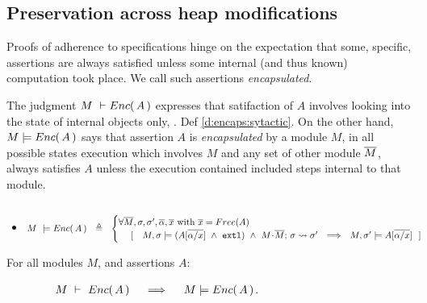 \subsection{Preservation across heap modifications}

 
Proofs of adherence to {\SpecLang specifications  hinge on the expectation that some,  specific, assertions are always satisfied unless some 
} internal (and thus known) computation took place. 
{We call such assertions   \emph{encapsulated}.}
 

The judgment $M\ \vdash {\ensuremath Enc(\, A\, )}$  expresses that satifaction of $A$ involves looking into the state of  
internal objects only,  \cf. Def \ref{d:encaps:sytactic}.
{On the other hand, $M  \models {\ensuremath Enc(\, A\, )}$ says that assertion $A$  is  \emph{encapsulated} by a module $M$, \ie in all possible states %
execution which involves $M$ and any set of other module $\overline{M}$, always satisfies  $A$  unless the execution contained included steps internal to that module}.
 

\begin{definition} $~$ \\
\label{d:encaps}
\begin{itemize}
\item
$ %
    M\ \models \encaps{A}\ \   \triangleq  \ \   
    \begin{cases}
     \forall \Mtwo, \sigma, \sigma',  \overline{\alpha}, \overline{x} \mbox{ with } \overline{x}=Free(A)\\ %
   \ \ \ \  [\ \ \  \satisfiesA{M}{\sigma}{({A[{\overline {\alpha/x}}]} \ \wedge\ \externalexec)}\  \wedge\ { \leadstoBounded {M\madd\Mtwo}  {\sigma}{\sigma'}} %
   \ \ \Longrightarrow\ \ 
   {M},{\sigma'}\models{A[{\overline {\alpha/x}}]} \ \  ]
    \end{cases}
 $%
 \end{itemize}
  \end{definition}
  
 
  \begin{lemma}
\label{lem:encap-soundness}
For all modules $M$, and assertions $A$: 

$\strut \hspace{1.5cm} M\ \vdash\ {Enc(\, A\, )} \ \ \ \ \Longrightarrow\ \ \ \ M \models {\ensuremath Enc(\, A\, )}$.
\end{lemma}

